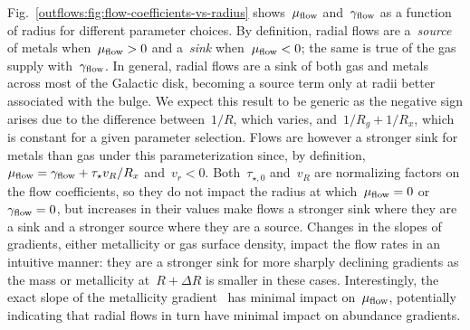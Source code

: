 Fig.~\ref{outflows:fig:flow-coefficients-vs-radius} shows~$\mu_{\text{flow}}$
and~$\gamma_{\text{flow}}$ as a function of radius for different parameter choices.
By definition, radial flows are a~\textit{source} of metals when~$\mu_{\text{flow}} > 0$
and a~\textit{sink} when~$\mu_{\text{flow}} < 0$; the same is true of the gas supply
with~$\gamma_{\text{flow}}$.
In general, radial flows are a sink of both gas and metals across most of the
Galactic disk, becoming a source term only at radii better associated with the
bulge.
We expect this result to be generic as the negative sign arises due to the
difference between~$1 / R$, which varies, and~$1 / R_g + 1 / R_x$, which is
constant for a given parameter selection.
Flows are however a stronger sink for metals than gas under this
parameterization since, by definition,~$\mu_{\text{flow}} = \gamma_{\text{flow}} + \tau_\star
v_R / R_x$ and~$v_r < 0$.
Both~$\tau_{\star,0}$ and~$v_R$ are normalizing factors on the flow
coefficients, so they do not impact the radius at which~$\mu_{\text{flow}} = 0$ or
$\gamma_{\text{flow}} = 0$, but increases in their values make flows a stronger sink
where they are a sink and a stronger source where they are a source.
Changes in the slopes of gradients, either metallicity or gas surface density,
impact the flow rates in an intuitive manner: they are a stronger sink for more
sharply declining gradients as the mass or metallicity at~$R + \Delta R$ is
smaller in these cases.
Interestingly, the exact slope of the metallicity gradient~ has minimal
impact on~$\mu_{\text{flow}}$, potentially indicating that radial flows in turn have
minimal impact on abundance gradients.




